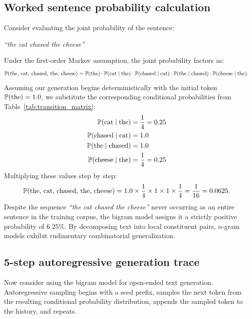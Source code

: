 \documentclass[../../main.tex]{subfiles}
\begin{document}
\subsection{Worked sentence probability calculation}
Consider evaluating the joint probability of the sentence:
\begin{center}
\textit{``the cat chased the cheese''}
\end{center}
Under the first-order Markov assumption, the joint probability factors as:
\begin{equation}
\label{eq:joint_calc_formula}
\mathbb{P}(\text{the, cat, chased, the, cheese}) = \mathbb{P}(\text{the}) \cdot \mathbb{P}(\text{cat} \mid \text{the}) \cdot \mathbb{P}(\text{chased} \mid \text{cat}) \cdot \mathbb{P}(\text{the} \mid \text{chased}) \cdot \mathbb{P}(\text{cheese} \mid \text{the}).
\end{equation}
Assuming our generation begins deterministically with the initial token $\mathbb{P}(\text{the}) = 1.0$, we substitute the corresponding conditional probabilities from Table~\ref{tab:transition_matrix}:
\begin{align}
\mathbb{P}(\text{cat} \mid \text{the}) &= \frac{1}{4} = 0.25 \notag \\
\mathbb{P}(\text{chased} \mid \text{cat}) &= 1.0 \notag \\
\mathbb{P}(\text{the} \mid \text{chased}) &= 1.0 \notag \\
\mathbb{P}(\text{cheese} \mid \text{the}) &= \frac{1}{4} = 0.25 \notag
\end{align}
Multiplying these values step by step:
\begin{equation}
\label{eq:joint_exact_result}
\mathbb{P}(\text{the, cat, chased, the, cheese}) = 1.0 \times \frac{1}{4} \times 1 \times 1 \times \frac{1}{4} = \frac{1}{16} = 0.0625.
\end{equation}
Despite the sequence \textit{``the cat chased the cheese''} never occurring as an entire sentence in the training corpus, the bigram model assigns it a strictly positive probability of $6.25\%$. By decomposing text into local constituent pairs, $n$-gram models exhibit rudimentary combinatorial generalization.

\subsection{5-step autoregressive generation trace}
Now consider using the bigram model for open-ended text generation. Autoregressive sampling begins with a seed prefix, samples the next token from the resulting conditional probability distribution, appends the sampled token to the history, and repeats.
\end{document}
